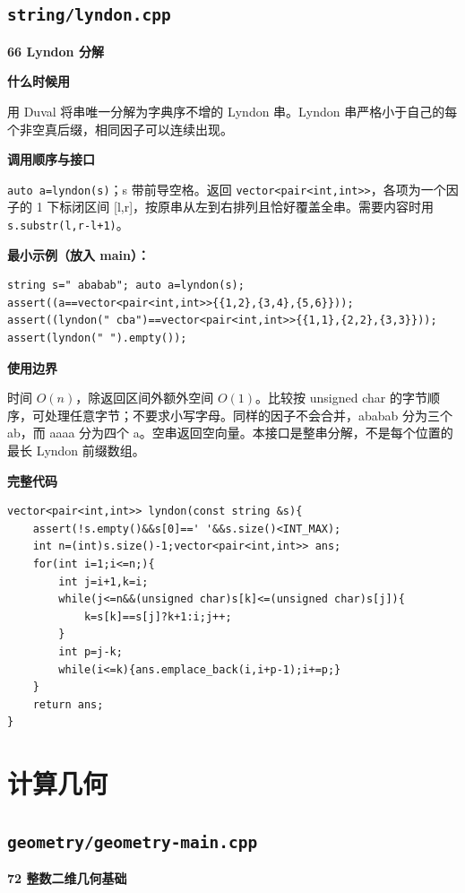 \documentclass[UTF8,a4paper,10pt]{ctexart}
\newcommand{\TemplUsage}[1]{\textbf{什么时候用}\par #1\par}
\newcommand{\TemplApi}[1]{\textbf{调用顺序与接口}\par #1\par}
\newcommand{\TemplNote}[1]{\textbf{使用边界}\par #1\par}
\begin{document}
\subsection{\texttt{string/lyndon.cpp}}
\textbf{66 Lyndon 分解}

\TemplUsage{用 Duval 将串唯一分解为字典序不增的 Lyndon 串。Lyndon 串严格小于自己的每个非空真后缀，相同因子可以连续出现。}
\TemplApi{\texttt{auto a=lyndon(s)}；s 带前导空格。返回 \texttt{vector<pair<int,int>>}，各项为一个因子的 1 下标闭区间 [l,r]，按原串从左到右排列且恰好覆盖全串。需要内容时用 \texttt{s.substr(l,r-l+1)}。}
\textbf{最小示例（放入 main）：}
\begin{lstlisting}
string s=" ababab"; auto a=lyndon(s);
assert((a==vector<pair<int,int>>{{1,2},{3,4},{5,6}}));
assert((lyndon(" cba")==vector<pair<int,int>>{{1,1},{2,2},{3,3}}));
assert(lyndon(" ").empty());
\end{lstlisting}
\TemplNote{时间 $O(n)$，除返回区间外额外空间 $O(1)$。比较按 unsigned char 的字节顺序，可处理任意字节；不要求小写字母。同样的因子不会合并，ababab 分为三个 ab，而 aaaa 分为四个 a。空串返回空向量。本接口是整串分解，不是每个位置的最长 Lyndon 前缀数组。}
\textbf{完整代码}
\begin{lstlisting}[firstnumber=1]
vector<pair<int,int>> lyndon(const string &s){
	assert(!s.empty()&&s[0]==' '&&s.size()<INT_MAX);
	int n=(int)s.size()-1;vector<pair<int,int>> ans;
	for(int i=1;i<=n;){
		int j=i+1,k=i;
		while(j<=n&&(unsigned char)s[k]<=(unsigned char)s[j]){
			k=s[k]==s[j]?k+1:i;j++;
		}
		int p=j-k;
		while(i<=k){ans.emplace_back(i,i+p-1);i+=p;}
	}
	return ans;
}
\end{lstlisting}
\par\vspace{1em}
\clearpage
\section{计算几何}
\subsection{\texttt{geometry/geometry-main.cpp}}
\textbf{72 整数二维几何基础}
\end{document}
